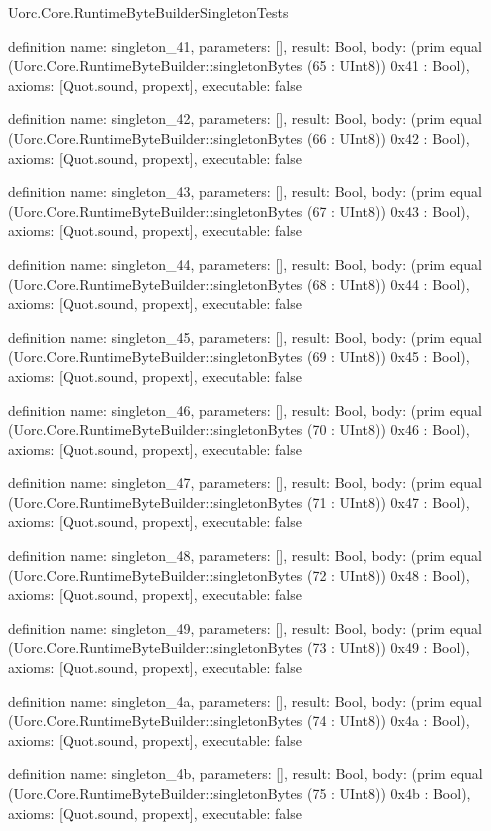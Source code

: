 \begin{lexlean}{Uorc.Core.RuntimeByteBuilderSingletonTests}
\begin{semanticmodule}
definition{
  name: singleton_41,
  parameters: [],
  result: Bool,
  body: (prim equal (Uorc.Core.RuntimeByteBuilder::singletonBytes (65 : UInt8)) 0x41 : Bool),
  axioms: [Quot.sound, propext],
  executable: false
}

definition{
  name: singleton_42,
  parameters: [],
  result: Bool,
  body: (prim equal (Uorc.Core.RuntimeByteBuilder::singletonBytes (66 : UInt8)) 0x42 : Bool),
  axioms: [Quot.sound, propext],
  executable: false
}

definition{
  name: singleton_43,
  parameters: [],
  result: Bool,
  body: (prim equal (Uorc.Core.RuntimeByteBuilder::singletonBytes (67 : UInt8)) 0x43 : Bool),
  axioms: [Quot.sound, propext],
  executable: false
}

definition{
  name: singleton_44,
  parameters: [],
  result: Bool,
  body: (prim equal (Uorc.Core.RuntimeByteBuilder::singletonBytes (68 : UInt8)) 0x44 : Bool),
  axioms: [Quot.sound, propext],
  executable: false
}

definition{
  name: singleton_45,
  parameters: [],
  result: Bool,
  body: (prim equal (Uorc.Core.RuntimeByteBuilder::singletonBytes (69 : UInt8)) 0x45 : Bool),
  axioms: [Quot.sound, propext],
  executable: false
}

definition{
  name: singleton_46,
  parameters: [],
  result: Bool,
  body: (prim equal (Uorc.Core.RuntimeByteBuilder::singletonBytes (70 : UInt8)) 0x46 : Bool),
  axioms: [Quot.sound, propext],
  executable: false
}

definition{
  name: singleton_47,
  parameters: [],
  result: Bool,
  body: (prim equal (Uorc.Core.RuntimeByteBuilder::singletonBytes (71 : UInt8)) 0x47 : Bool),
  axioms: [Quot.sound, propext],
  executable: false
}

definition{
  name: singleton_48,
  parameters: [],
  result: Bool,
  body: (prim equal (Uorc.Core.RuntimeByteBuilder::singletonBytes (72 : UInt8)) 0x48 : Bool),
  axioms: [Quot.sound, propext],
  executable: false
}

definition{
  name: singleton_49,
  parameters: [],
  result: Bool,
  body: (prim equal (Uorc.Core.RuntimeByteBuilder::singletonBytes (73 : UInt8)) 0x49 : Bool),
  axioms: [Quot.sound, propext],
  executable: false
}

definition{
  name: singleton_4a,
  parameters: [],
  result: Bool,
  body: (prim equal (Uorc.Core.RuntimeByteBuilder::singletonBytes (74 : UInt8)) 0x4a : Bool),
  axioms: [Quot.sound, propext],
  executable: false
}

definition{
  name: singleton_4b,
  parameters: [],
  result: Bool,
  body: (prim equal (Uorc.Core.RuntimeByteBuilder::singletonBytes (75 : UInt8)) 0x4b : Bool),
  axioms: [Quot.sound, propext],
  executable: false
}


\end{semanticmodule}
\end{lexlean}
